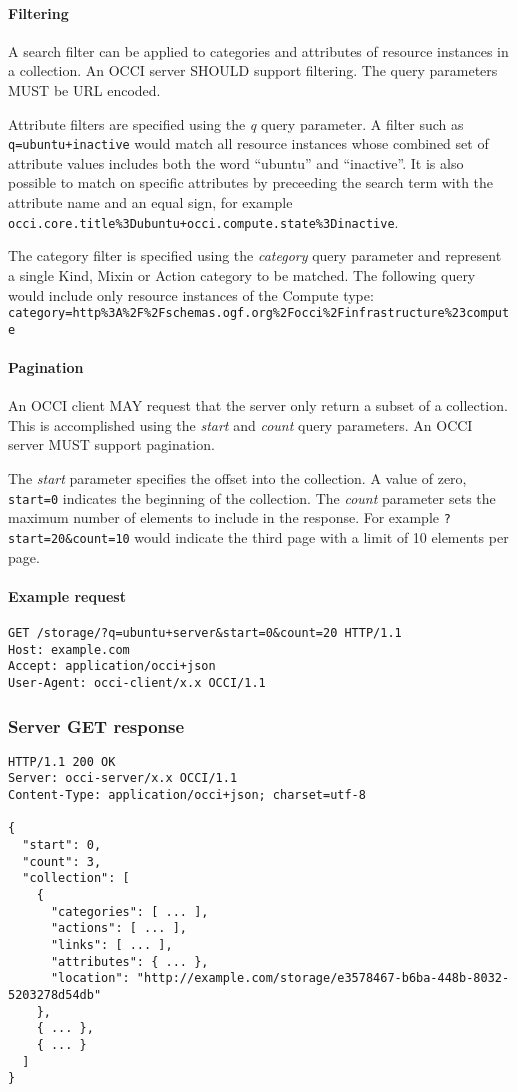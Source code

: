 \documentclass[10pt,a4paper]{article}
\begin{document}
\paragraph*{Filtering} A search filter can be applied to categories and attributes
of resource instances in a collection. An OCCI server SHOULD support filtering.
The query parameters MUST be URL encoded.

Attribute filters are specified using the {\em q} query parameter.  A filter such
as {\tt q=ubuntu+inactive} would match all resource instances whose combined
set of attribute values includes both the word ``ubuntu'' and ``inactive''. It
is also possible to match on specific attributes by preceeding the search term
with the attribute name and an equal sign, for example {\tt
occi.core.title\%3Dubuntu+occi.compute.state\%3Dinactive}. 

The category filter is specified using the {\em category} query parameter and
represent a single Kind, Mixin or Action category to be matched. The following
query would include only resource instances of the Compute type:
{\tt category=http\%3A\%2F\%2Fschemas.ogf.org\%2Focci\%2Finfrastructure\%23compute}

\paragraph*{Pagination} An OCCI client MAY request that the server only return
a subset of a collection. This is accomplished using the {\em start} and
{\em count} query parameters.  An OCCI server MUST support pagination.

The {\em start} parameter specifies the offset into the collection. A value of
zero, {\tt start=0} indicates the beginning of the collection.
%
The {\em count} parameter sets the maximum number of elements to include in the
response. For example {\tt ?start=20\&count=10} would indicate the third page
with a limit of 10 elements per page.

\paragraph*{Example request}

\begin{verbatim}
GET /storage/?q=ubuntu+server&start=0&count=20 HTTP/1.1
Host: example.com
Accept: application/occi+json
User-Agent: occi-client/x.x OCCI/1.1
\end{verbatim}

\subsubsection{Server GET response}
\begin{verbatim}
HTTP/1.1 200 OK
Server: occi-server/x.x OCCI/1.1
Content-Type: application/occi+json; charset=utf-8

{
  "start": 0,
  "count": 3,
  "collection": [
    {
      "categories": [ ... ],
      "actions": [ ... ],
      "links": [ ... ],
      "attributes": { ... },
      "location": "http://example.com/storage/e3578467-b6ba-448b-8032-5203278d54db"
    },
    { ... },
    { ... }
  ]
}
\end{verbatim}
\end{document}
